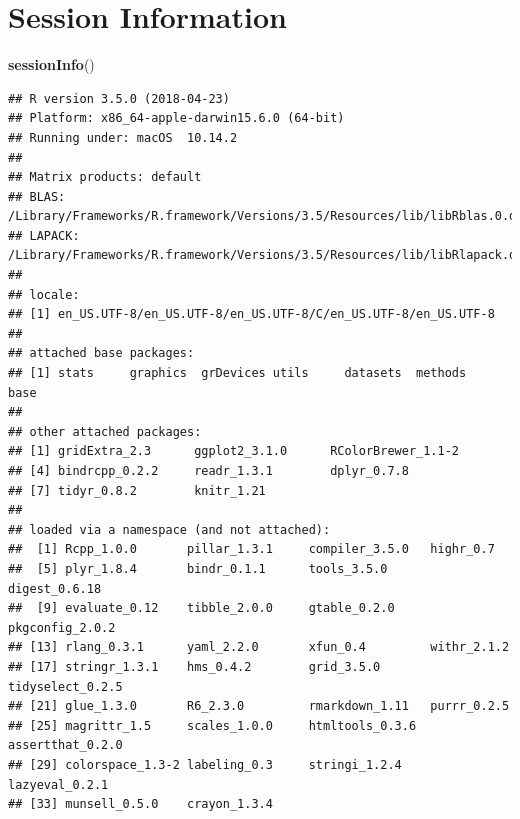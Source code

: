 \documentclass[]{article}
\newenvironment{Shaded}{\begin{snugshade}}{\end{snugshade}}
\newcommand{\KeywordTok}[1]{\textcolor[rgb]{0.13,0.29,0.53}{\textbf{#1}}}
\newcommand{\NormalTok}[1]{#1}
\begin{document}
\section{Session Information}\label{session-information}

\begin{Shaded}
\begin{Highlighting}[]
\KeywordTok{sessionInfo}\NormalTok{()}
\end{Highlighting}
\end{Shaded}

\begin{verbatim}
## R version 3.5.0 (2018-04-23)
## Platform: x86_64-apple-darwin15.6.0 (64-bit)
## Running under: macOS  10.14.2
## 
## Matrix products: default
## BLAS: /Library/Frameworks/R.framework/Versions/3.5/Resources/lib/libRblas.0.dylib
## LAPACK: /Library/Frameworks/R.framework/Versions/3.5/Resources/lib/libRlapack.dylib
## 
## locale:
## [1] en_US.UTF-8/en_US.UTF-8/en_US.UTF-8/C/en_US.UTF-8/en_US.UTF-8
## 
## attached base packages:
## [1] stats     graphics  grDevices utils     datasets  methods   base     
## 
## other attached packages:
## [1] gridExtra_2.3      ggplot2_3.1.0      RColorBrewer_1.1-2
## [4] bindrcpp_0.2.2     readr_1.3.1        dplyr_0.7.8       
## [7] tidyr_0.8.2        knitr_1.21        
## 
## loaded via a namespace (and not attached):
##  [1] Rcpp_1.0.0       pillar_1.3.1     compiler_3.5.0   highr_0.7       
##  [5] plyr_1.8.4       bindr_0.1.1      tools_3.5.0      digest_0.6.18   
##  [9] evaluate_0.12    tibble_2.0.0     gtable_0.2.0     pkgconfig_2.0.2 
## [13] rlang_0.3.1      yaml_2.2.0       xfun_0.4         withr_2.1.2     
## [17] stringr_1.3.1    hms_0.4.2        grid_3.5.0       tidyselect_0.2.5
## [21] glue_1.3.0       R6_2.3.0         rmarkdown_1.11   purrr_0.2.5     
## [25] magrittr_1.5     scales_1.0.0     htmltools_0.3.6  assertthat_0.2.0
## [29] colorspace_1.3-2 labeling_0.3     stringi_1.2.4    lazyeval_0.2.1  
## [33] munsell_0.5.0    crayon_1.3.4
\end{verbatim}
\end{document}
